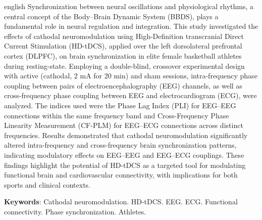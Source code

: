 \begin{resumo}[Abstract]
\begin{otherlanguage*}{english}
Synchronization between neural oscillations and physiological rhythms, a central concept of the Body–Brain Dynamic System (BBDS), plays a fundamental role in neural regulation and integration. This study investigated the effects of cathodal neuromodulation using High-Definition transcranial Direct Current Stimulation (HD-tDCS), applied over the left dorsolateral prefrontal cortex (DLPFC), on brain synchronization in elite female basketball athletes during resting-state. Employing a double-blind, crossover experimental design with active (cathodal, 2 mA for 20 min) and sham sessions, intra-frequency phase coupling between pairs of electroencephalography (EEG) channels, as well as cross-frequency phase coupling between EEG and electrocardiogram (ECG), were analyzed. The indices used were the Phase Lag Index (PLI) for EEG–EEG connections within the same frequency band and Cross-Frequency Phase Linearity Measurement (CF-PLM) for EEG–ECG connections across distinct frequencies. Results demonstrated that cathodal neuromodulation significantly altered intra-frequency and cross-frequency brain synchronization patterns, indicating modulatory effects on EEG–EEG and EEG–ECG couplings. These findings highlight the potential of HD-tDCS as a targeted tool for modulating functional brain and cardiovascular connectivity, with implications for both sports and clinical contexts.

\vspace{\onelineskip}
 
\noindent 
\textbf{Keywords}: Cathodal neuromodulation. HD-tDCS. EEG. ECG. Functional connectivity. Phase synchronization. Athletes.
\end{otherlanguage*}
\end{resumo}